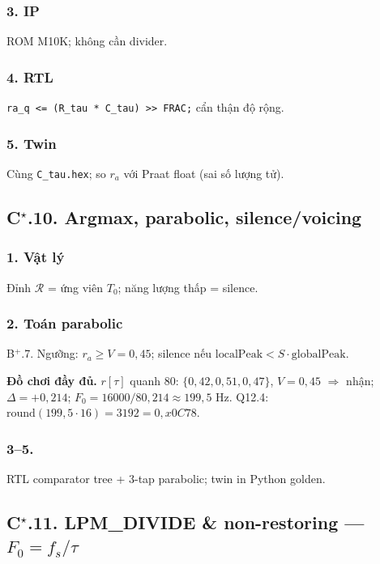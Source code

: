 \subsubsection*{3. IP} ROM M10K; không cần divider.

\subsubsection*{4. RTL} \texttt{ra_q <= (R_tau * C_tau) >> FRAC;} cẩn thận độ rộng.

\subsubsection*{5. Twin} Cùng \texttt{C\_tau.hex}; so $r_a$ với Praat float (sai số lượng tử).

\subsection*{C$^\star$.10. Argmax, parabolic, silence/voicing}

\subsubsection*{1. Vật lý} Đỉnh $\mathcal{R}$ = ứng viên $T_0$; năng lượng thấp = silence.

\subsubsection*{2. Toán parabolic} B$^+$.7. Ngưỡng: $r_a\ge V=0{,}45$; silence nếu $\mathrm{localPeak}<S\cdot\mathrm{globalPeak}$.

\noindent\textbf{Đồ chơi đầy đủ.} $r[\tau]$ quanh 80: $\{0{,}42,0{,}51,0{,}47\}$, $V=0{,}45$ $\Rightarrow$ nhận; $\Delta=+0{,}214$; $F_0=16000/80{,}214\approx199{,}5\text{ Hz}$. Q12.4: $\mathrm{round}(199{,}5\cdot16)=3192=0{,}x0C78$.

\subsubsection*{3--5.} RTL comparator tree + 3-tap parabolic; twin in Python golden.

\subsection*{C$^\star$.11. LPM\_DIVIDE \& non-restoring --- $F_0=f_s/\tau$}

